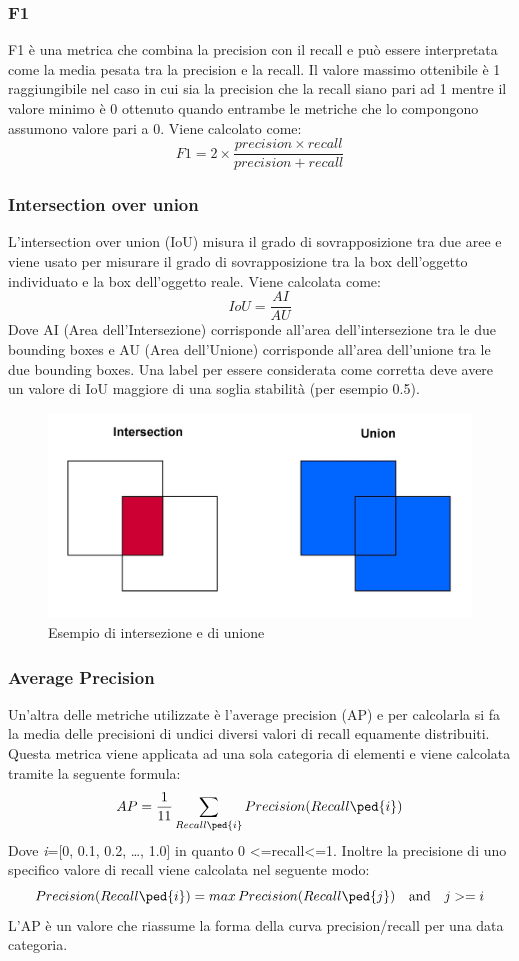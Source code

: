 \subsubsection{F1}
F1 è una metrica che combina la precision con il recall e può essere interpretata come la media pesata tra la precision e la recall. Il valore massimo ottenibile è 1 raggiungibile nel caso in cui sia la precision che la recall siano pari ad 1 mentre il valore minimo è 0 ottenuto quando entrambe le metriche che lo compongono assumono valore pari a 0. Viene calcolato come:
\[
    F1 = 2 \times \frac{precision \times recall}{precision + recall}
\]
\subsubsection{Intersection over union}
L'intersection over union (IoU) misura il grado di sovrapposizione tra due aree e viene usato per misurare il grado di sovrapposizione tra la box dell'oggetto individuato e la box dell'oggetto reale. Viene calcolata come:
\[
    IoU = \frac{AI}{AU}
\]
Dove AI (Area dell'Intersezione) corrisponde all'area dell'intersezione tra le due bounding boxes e AU (Area dell'Unione) corrisponde all'area dell'unione tra le due bounding boxes.
Una label per essere considerata come corretta deve avere un valore di IoU maggiore di una soglia stabilità (per esempio 0.5).
\begin{figure}[H]
	\centering
	\includegraphics[width=0.5\linewidth]{images/unione-intersezione.jpg}
	\caption{Esempio di intersezione e di unione}
	\label{Esempio di intersezione e di unione}
\end{figure}
\subsubsection{Average Precision}
Un'altra delle metriche utilizzate è l'average precision (AP) e per calcolarla si fa la media delle precisioni di undici diversi valori di recall equamente distribuiti. Questa metrica viene applicata ad una sola categoria di elementi e viene calcolata tramite la seguente formula:
\[
    AP = \frac{1}{11}\sum_{Recall\ped{i}}^{} Precision(Recall\ped{i})
\]
Dove \textit{i}=[0, 0.1, 0.2, …, 1.0] in quanto 0 \textless =recall\textless =1. Inoltre la precisione di uno specifico valore di recall viene calcolata nel seguente modo:
\[
    Precision(Recall\ped{i}) = max\,Precision(Recall\ped{j}) \quad \textrm{and} \quad j>=i
\]
L'AP è un valore che riassume la forma della curva precision/recall per una data categoria.
